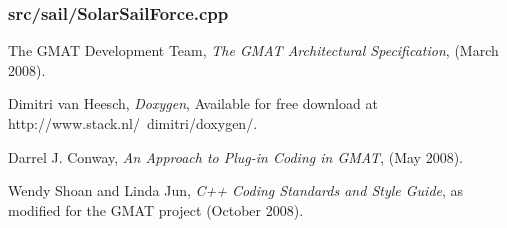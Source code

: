 \documentclass[letterpaper,10pt]{article}
\begin{document}


\subsubsection{src/sail/SolarSailForce.cpp}



\begin{thebibliography}{10}
 The GMAT Development Team, \textit{The GMAT Architectural Specification}, (March
2008).

 Dimitri van Heesch, \textit{Doxygen}, Available for free download at
http://www.stack.nl/~dimitri/doxygen/.

 Darrel J. Conway, \textit{An Approach to Plug-in Coding in GMAT}, (May 2008).

 Wendy Shoan and Linda Jun, \textit{C++ Coding Standards and Style Guide},
as modified for the GMAT project (October 2008).

\end{thebibliography}
\end{document}

